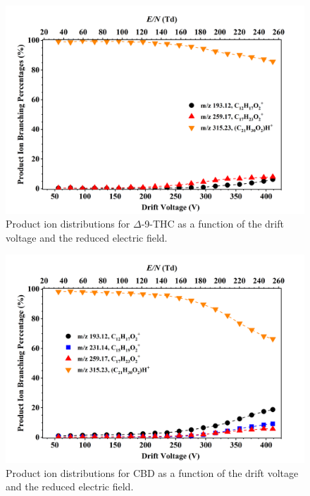  
\begin{figure}[htb]
\centering
\includegraphics[width=0.80\linewidth]{pics/other_drugs/THC-br.png}
\caption{Product ion distributions for $\Delta$-9-THC as a function of the drift voltage and the reduced electric field.}
\label{fig:DR_THC}
\end{figure}



\begin{figure}[htb]
\centering
\includegraphics[width=0.80\linewidth]{pics/other_drugs/CBD-br.png}
\caption{Product ion distributions for CBD as a function of the drift voltage and the reduced electric field.}
\label{fig:DR_CBD}
\end{figure}



